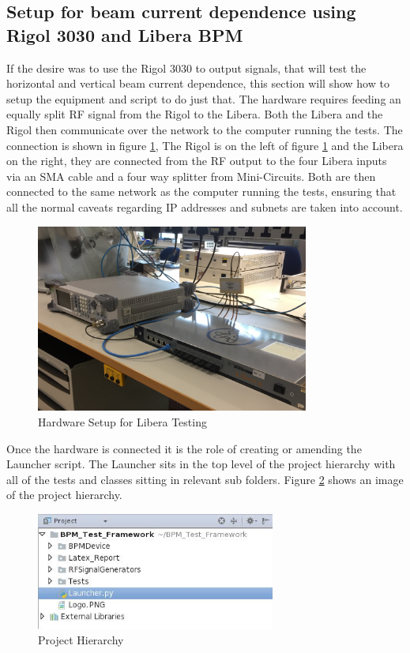 \documentclass[a4paper, 11pt]{article}
\begin{document}
\subsection{Setup for beam current dependence using Rigol 3030 and Libera BPM}
If the desire was to use the Rigol 3030 to output signals, that will test the horizontal and vertical beam current dependence, this section will show how to setup the equipment and script to do just that. The hardware requires feeding an equally split RF signal from the Rigol to the Libera. Both the Libera and the Rigol then communicate over the network to the computer running the tests. The connection is shown in figure \ref{fig:SimpleHW}, The Rigol is on the left of figure \ref{fig:SimpleHW} and the Libera on the right, they are connected from the RF output to the four Libera inputs via an SMA cable and a four way splitter from Mini-Circuits. Both are then connected to the same network as the computer running the tests, ensuring that all the normal caveats regarding IP addresses and subnets are taken into account. 

\begin{figure}[H]
\centering
\includegraphics[width=0.8\textwidth]{SimpleHW.jpg}
\caption{Hardware Setup for Libera Testing}
\label{fig:SimpleHW}
\end{figure}

Once the hardware is connected it is the role of creating or amending the Launcher script. The Launcher sits in the top level of the project hierarchy with all of the tests and classes sitting in relevant sub folders. Figure \ref{fig:ProjectHierarchy} shows an image of the project hierarchy. 

\begin{figure}[H]
\centering
\includegraphics[width=0.7\textwidth]{ProjectStructure.jpeg}
\caption{Project Hierarchy}
\label{fig:ProjectHierarchy}
\end{figure}
\end{document}
